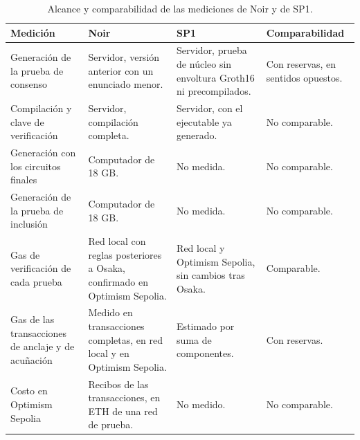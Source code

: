 \begin{table}[htbp]
	\centering
	\caption{Alcance y comparabilidad de las mediciones de Noir y de SP1.}
	\label{tab:metodologia_comparabilidad}
	\footnotesize
	\begin{tabular}{>{\raggedright\arraybackslash}p{3.2cm} >{\raggedright\arraybackslash}p{4.0cm}
		>{\raggedright\arraybackslash}p{4.0cm} >{\raggedright\arraybackslash}p{3.6cm}}
		\toprule
		\textbf{Medición} & \textbf{Noir} & \textbf{SP1} & \textbf{Comparabilidad} \\
		\midrule
		Generación de la prueba de consenso & Servidor, versión anterior con un enunciado menor. &
		Servidor, prueba de núcleo sin envoltura Groth16 ni precompilados. & Con reservas, en
		sentidos opuestos. \\
		\addlinespace
		Compilación y clave de verificación & Servidor, compilación completa. & Servidor, con el
		ejecutable ya generado. & No comparable. \\
		\addlinespace
		Generación con los circuitos finales & Computador de 18 GB. & No medida. & No comparable. \\
		\addlinespace
		Generación de la prueba de inclusión & Computador de 18 GB. & No medida. & No comparable. \\
		\addlinespace
		Gas de verificación de cada prueba & Red local con reglas posteriores a Osaka, confirmado en
		Optimism Sepolia. & Red local y Optimism Sepolia, sin cambios tras Osaka. & Comparable. \\
		\addlinespace
		Gas de las transacciones de anclaje y de acuñación & Medido en transacciones completas, en
		red local y en Optimism Sepolia. & Estimado por suma de componentes. & Con reservas. \\
		\addlinespace
		Costo en Optimism Sepolia & Recibos de las transacciones, en ETH de una red de prueba. & No
		medido. & No comparable. \\
		\bottomrule
	\end{tabular}
\end{table}
